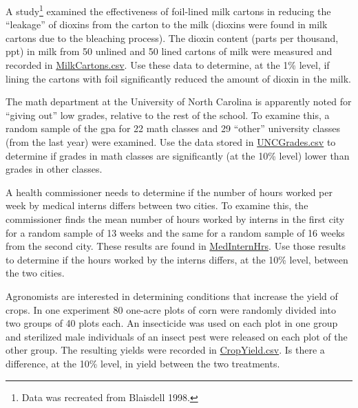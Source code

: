 \documentclass[10pt,openany]{book}\usepackage[]{graphicx}\usepackage[]{color}
\begin{document}
\newpage
\begin{exsection}
  \item \label{revex:tTestMilk} \rhw{} A study\footnote{Data was recreated from Blaisdell 1998.} examined the effectiveness of foil-lined milk cartons in reducing the ``leakage'' of dioxins from the carton to the milk (dioxins were found in milk cartons due to the bleaching process).  The dioxin content (parts per thousand, ppt) in milk from 50 unlined and 50 lined cartons of milk were measured and recorded in \href{https://raw.githubusercontent.com/droglenc/NCData/master/MilkCartons.csv}{MilkCartons.csv}.  Use these data to determine, at the 1\% level, if lining the cartons with foil significantly reduced the amount of dioxin in the milk. 

  \item \label{revex:tTestMathGrades} \rhw{} The math department at the University of North Carolina is apparently noted for ``giving out'' low grades, relative to the rest of the school.  To examine this, a random sample of the gpa for 22 math classes and 29 ``other'' university classes (from the last year) were examined.  Use the data stored in \href{https://raw.githubusercontent.com/droglenc/NCData/master/UNCgrades.csv}{UNCGrades.csv} to determine if grades in math classes are significantly (at the 10\% level) lower than grades in other classes. 

  \item \label{revex:tTestMedSchool} \rhw{} A health commissioner needs to determine if the number of hours worked per week by medical interns differs between two cities.  To examine this, the commissioner finds the mean number of hours worked by interns in the first city for a random sample of 13 weeks and the same for a random sample of 16 weeks from the second city.  These results are found in \href{https://sites.google.com/site/ncstats/data/MedInternHrs}{MedInternHrs}.  Use those results to determine if the hours worked by the interns differs, at the 10\% level, between the two cities. 

  \item \label{revex:tTestYield} \rhw{} Agronomists are interested in determining conditions that increase the yield of crops.  In one experiment 80 one-acre plots of corn were randomly divided into two groups of 40 plots each.  An insecticide was used on each plot in one group and sterilized male individuals of an insect pest were released on each plot of the other group.  The resulting yields were recorded in \href{https://raw.githubusercontent.com/droglenc/NCData/master/CropYield.csv}{CropYield.csv}.  Is there a difference, at the 10\% level, in yield between the two treatments.  


\end{exsection}
\end{document}
